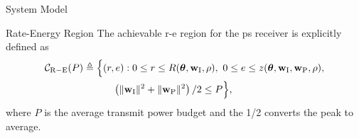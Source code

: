 \begin{section}{System Model}
	\begin{subsection}{Rate-Energy Region}
		The achievable \gls{r-e} region for the \gls{ps} receiver is explicitly defined as
		\begin{equation}
			\begin{split}
				\mathcal{C}_\mathrm{R-E}(P)\triangleq \Bigl\{
					& (r,e) : 0 \le r \le R(\boldsymbol{\theta},\mathbf{w}_{\mathrm{I}},\rho), \ 0 \le e \le z(\boldsymbol{\theta},\mathbf{w}_{\mathrm{I}},\mathbf{w}_{\mathrm{P}},\rho),\\
					& \quad \left(\lVert{\mathbf{w}_{\mathrm{I}}}\rVert^2+\lVert{\mathbf{w}_{\mathrm{P}}}\rVert^2\right)/2 \le P \Bigr\},
			\end{split}
		\end{equation}
		where $P$ is the average transmit power budget and the 1/2 converts the peak to average.
	\end{subsection}
\end{section}


